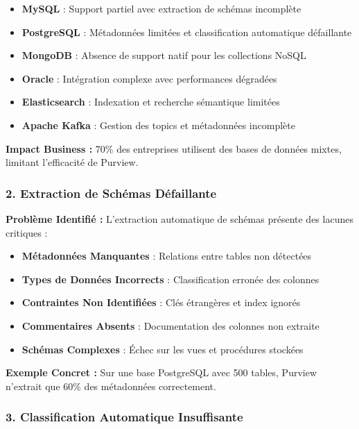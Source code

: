 \documentclass[12pt,a4paper]{article}
\begin{document}
\begin{itemize}
    \item \textbf{MySQL} : Support partiel avec extraction de schémas incomplète
    \item \textbf{PostgreSQL} : Métadonnées limitées et classification automatique défaillante
    \item \textbf{MongoDB} : Absence de support natif pour les collections NoSQL
    \item \textbf{Oracle} : Intégration complexe avec performances dégradées
    \item \textbf{Elasticsearch} : Indexation et recherche sémantique limitées
    \item \textbf{Apache Kafka} : Gestion des topics et métadonnées incomplète
\end{itemize}

\textbf{Impact Business :} 70\% des entreprises utilisent des bases de données mixtes, limitant l'efficacité de Purview.

\subsubsection{2. Extraction de Schémas Défaillante}

\textbf{Problème Identifié :} L'extraction automatique de schémas présente des lacunes critiques :

\begin{itemize}
    \item \textbf{Métadonnées Manquantes} : Relations entre tables non détectées
    \item \textbf{Types de Données Incorrects} : Classification erronée des colonnes
    \item \textbf{Contraintes Non Identifiées} : Clés étrangères et index ignorés
    \item \textbf{Commentaires Absents} : Documentation des colonnes non extraite
    \item \textbf{Schémas Complexes} : Échec sur les vues et procédures stockées
\end{itemize}

\textbf{Exemple Concret :} Sur une base PostgreSQL avec 500 tables, Purview n'extrait que 60\% des métadonnées correctement.

\subsubsection{3. Classification Automatique Insuffisante}
\end{document}
